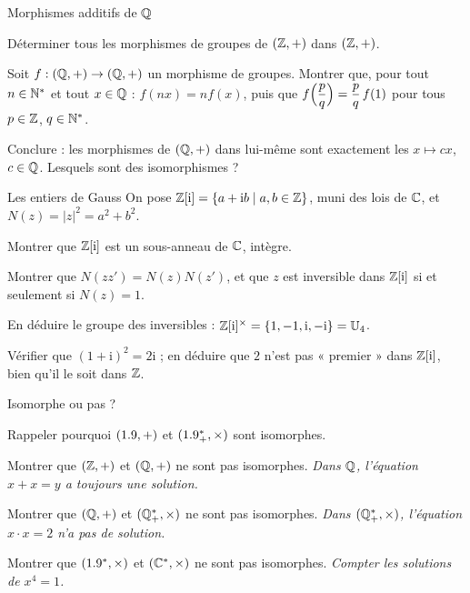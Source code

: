 \begin{exercice}[3]{Morphismes additifs de $\mathbb{Q}$}
\begin{questions}
  \item Déterminer tous les morphismes de groupes de $(\mathbb{Z},+)$ dans
    $(\mathbb{Z},+)$.
  \item Soit $f:(\mathbb{Q},+)\to(\mathbb{Q},+)$ un morphisme de groupes. Montrer que,
    pour tout $n\in\mathbb{N}^{*}$ et tout $x\in\mathbb{Q}$ : $f(nx)=nf(x)$, puis que
    $f\Bigl(\dfrac{p}{q}\Bigr)=\dfrac{p}{q}\,f(1)$ pour tous
    $p\in\mathbb{Z}$, $q\in\mathbb{N}^{*}$.
  \item Conclure : les morphismes de $(\mathbb{Q},+)$ dans lui-même sont
    exactement les $x\mapsto cx$, $c\in\mathbb{Q}$. Lesquels sont des
    isomorphismes ?
\end{questions}
\end{exercice}

\begin{exercice}[3]{Les entiers de Gauss}
On pose $\mathbb{Z}[\mathrm{i}]=\left\{a+\mathrm{i}b \mid a,b\in\mathbb{Z}\right\}$, muni des lois
de $\mathbb{C}$, et $N(z)=|z|^{2}=a^{2}+b^{2}$.
\begin{questions}
  \item Montrer que $\mathbb{Z}[\mathrm{i}]$ est un sous-anneau de $\mathbb{C}$, intègre.
  \item Montrer que $N(zz')=N(z)N(z')$, et que $z$ est inversible dans
    $\mathbb{Z}[\mathrm{i}]$ si et seulement si $N(z)=1$.
  \item En déduire le groupe des inversibles :
    $\mathbb{Z}[\mathrm{i}]^{\times}=\left\{1,-1,\mathrm{i},-\mathrm{i}\right\}=\mathbb{U}_4$.
  \item Vérifier que $(1+\mathrm{i})^{2}=2\mathrm{i}$ ; en déduire que $2$
    n'est pas « premier » dans $\mathbb{Z}[\mathrm{i}]$, bien qu'il le soit dans
    $\mathbb{Z}$.
\end{questions}
\end{exercice}

\begin{exercice}[3]{Isomorphe ou pas ?}
\begin{questions}
  \item Rappeler pourquoi $(1.9,+)$ et $(1.9_{+}^{*},\times)$ sont
    isomorphes.
  \item Montrer que $(\mathbb{Z},+)$ et $(\mathbb{Q},+)$ ne sont pas isomorphes.
    \emph{Dans $\mathbb{Q}$, l'équation $x+x=y$ a toujours une solution.}
  \item Montrer que $(\mathbb{Q},+)$ et $(\mathbb{Q}_{+}^{*},\times)$ ne sont pas
    isomorphes. \emph{Dans $(\mathbb{Q}_{+}^{*},\times)$, l'équation
    $x\cdot x=2$ n'a pas de solution.}
  \item Montrer que $(1.9^{*},\times)$ et $(\mathbb{C}^{*},\times)$ ne sont pas
    isomorphes. \emph{Compter les solutions de $x^{4}=1$.}
\end{questions}
\end{exercice}

